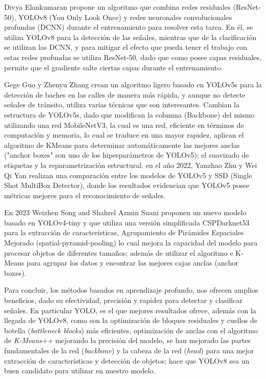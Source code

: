 \documentclass{article}
\begin{document}
Divya Elankumaran \cite{ref5} propone un algoritmo que combina redes residuales (ResNet-50), YOLOv8 (You Only Look Once) y redes neuronales convolucionales profundas (DCNN) durante el entrenamiento para resolver esta tarea. En él, se utiliza YOLOv8 para la detección de las señales, mientras que de la clasificación se utilizan las DCNN, y para mitigar el efecto que pueda tener el trabajo con estas redes profundas se utiliza ResNet-50, dado que como posee capas residuales, permite que el gradiente salte ciertas capas durante el entrenamiento.

Gege Guo y Zhenyu Zhang \cite{ref9} crean un algoritmo ligero basado en YOLOv5s para la detección de baches en las calles de manera más rápida, y aunque no detecte señales de tránsito, utiliza varias técnicas que son interesantes. Cambian la estructura de YOLOv5s, dado que modifican la columna (Backbone) del mismo utilizando una red MobileNetV3, la cual es una red, eficiente en términos de computación y memoria, lo cual se traduce en una mayor rapidez, aplican el algoritmo de KMeans para determinar automáticamente las mejores anclas ("anchor boxes" son uno de los hiperparámetros de YOLOv5); el suavizado de etiquetas y la reparametrización estructural. en el año 2022, Yanzhao Zhu y Wei Qi Yan \cite{ref1} realizan una comparación entre los modelos de YOLOv5 y SSD (Single Shot MultiBox Detector), donde los resultados evidencian que YOLOv5 posee métricas mejores para el reconocimiento de señales.


En 2023 Weizhen Song and Shahrel Azmin Suani\cite{ref2} proponen un nuevo modelo basado en YOLOv4-tiny y que utiliza una versión simplificada CSPDarknet53 para la extracción de características, Agrupamiento de Pirámides Espaciales Mejorado (spatial-pyramid-pooling) lo cual mejora la capacidad del modelo para procesar objetos de diferentes tamaños; además de utilizar el algoritmo e K-Means para agrupar los datos y encontrar las mejores cajas anclas (anchor boxes).

Para concluir, los métodos basados en aprendizaje profundo, nos ofrecen amplios beneficios, dado su efectividad, precisión y rapidez para detectar y clasificar señales. En particular YOLO, es el que mejores resultados ofrece, además con la llegada de YOLOv8, como son la optimización de bloques residuales y cuellos de botella (\textit{bottleneck blocks}) más eficientes, optimización de anclas con el algoritmo de \textit{K-Means++} mejorando la precisión del modelo, se han mejorado las partes fundamentales de la red (\textit{backbone}) y la cabeza de la red (\textit{head}) para una mejor extracción de características y detección de objetos; hace que YOLOv8 sea un buen candidato para utilizar en nuestro modelo.
\end{document}
